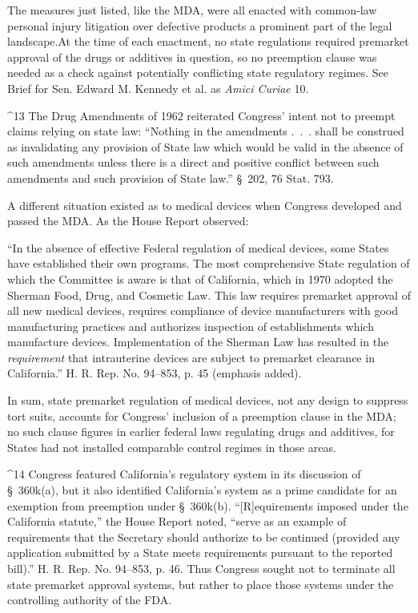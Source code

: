 {{{  The measures just listed, like the MDA, were all enacted with
common-law personal injury litigation over defective products a
prominent part of the legal landscape.\footnotemark[13] At the \newpage  time of each
enactment, no state regulations required premarket approval of the drugs
or additives in question, so no preemption clause was needed as a check
against potentially conflicting state regulatory regimes. See Brief
for Sen. Edward M. Kennedy et al. as \emph{Amici Curiae} 10.

^13 The Drug Amendments of 1962 reiterated Congress' intent not to
preempt claims relying on state law: ``Nothing in the amendments
.~.~. shall be construed as invalidating any provision of State law
which would be valid in the absence of such amendments unless there is a
direct and positive conflict between such amendments and such provision
of State law.'' \S~202, 76 Stat. 793.

  A different situation existed as to medical devices when Congress
developed and passed the MDA. As the House Report observed:

      ``In the absence of effective Federal regulation of medical
    devices, some States have established their own programs. The most
    comprehensive State regulation of which the Committee is aware
    is that of California, which in 1970 adopted the Sherman Food,
    Drug, and Cosmetic Law. This law requires premarket approval of all
    new medical devices, requires compliance of device manufacturers
    with good manufacturing practices and authorizes inspection of
    establishments which manufacture devices. Implementation of the
    Sherman Law has resulted in the \emph{requirement} that intrauterine
    devices are subject to premarket clearance in California.'' H. R.
    Rep. No. 94--853, p. 45 (emphasis added).\footnotemark[14]

\noindent In sum, state premarket regulation of medical devices, not any design to
suppress tort suits, accounts for Congress' inclusion of a preemption
clause in the MDA; no such clause figures in earlier federal laws
regulating drugs and additives, for States had not installed comparable
control regimes in those areas.\newpage 

^14 Congress featured California's regulatory system in its discussion
of \S~360k(a), but it also identified California's system as a
prime candidate for an exemption from preemption under \S~360k(b).
``[R]equirements imposed under the California statute,'' the House
Report noted, ``serve as an example of requirements that the Secretary
should authorize to be continued (provided any application submitted
by a State meets requirements pursuant to the reported bill).'' H.
R. Rep. No. 94--853, p. 46. Thus Congress sought not to terminate
all state premarket approval systems, but rather to place those systems
under the controlling authority of the FDA.

}}}
